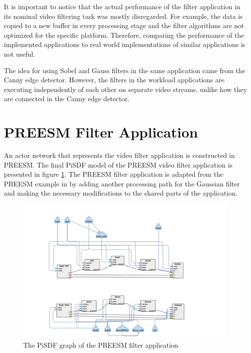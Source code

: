 It is important to notice that the actual performance of the filter application in its nominal video filtering task was mostly disregarded. For example, the data is copied to a new buffer in every processing stage and the filter algorithms are not optimized for the specific platform. Therefore, comparing the performance of the implemented applications to real world implementations of similar applications is not useful.

The idea for using Sobel and Gauss filters in the same application came from the Canny edge detector. However, the filters in the workload applications are executing independently of each other on separate video streams, unlike how they are connected in the Canny edge detector.

\section{PREESM Filter Application}
\label{sec:preesmapp}
An actor network that represents the video filter application is constructed in PREESM. The final PiSDF model of the PREESM video filter application is presented in figure \ref{fig:preesm_actors}. The PREESM filter application is adapted from the PREESM example in \cite{preesmtut} by adding another processing path for the Gaussian filter and making the necessary modifications to the shared parts of the application.

\begin{figure}[h!]
    \begin{center}
        \includegraphics[width=0.99\textwidth]{images/preesm_diagram.png}
        \caption{The PiSDF graph of the PREESM filter application}
        \label{fig:preesm_actors}
    \end{center}
\end{figure}

